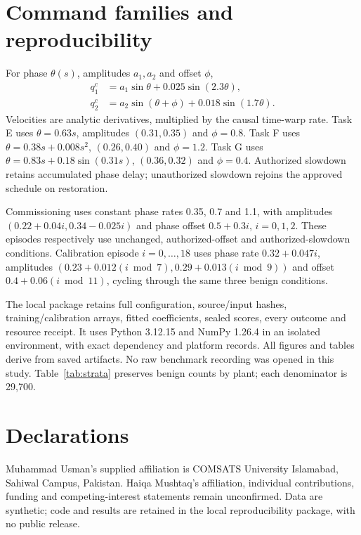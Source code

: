 \documentclass[11pt]{article}
\begin{document}
\clearpage
\appendix
\section{Command families and reproducibility}\label{app:tasks}
For phase $\theta(s)$, amplitudes $a_1,a_2$ and offset $\phi$,
\begin{align}
q_1^c&=a_1\sin\theta+0.025\sin(2.3\theta),\\
q_2^c&=a_2\sin(\theta+\phi)+0.018\sin(1.7\theta).
\end{align}
Velocities are analytic derivatives, multiplied by the causal time-warp rate. Task E uses $\theta=0.63s$, amplitudes $(0.31,0.35)$ and $\phi=0.8$. Task F uses $\theta=0.38s+0.008s^2$, $(0.26,0.40)$ and $\phi=1.2$. Task G uses $\theta=0.83s+0.18\sin(0.31s)$, $(0.36,0.32)$ and $\phi=0.4$. Authorized slowdown retains accumulated phase delay; unauthorized slowdown rejoins the approved schedule on restoration.

Commissioning uses constant phase rates 0.35, 0.7 and 1.1, with amplitudes $(0.22+0.04i,0.34-0.025i)$ and phase offset $0.5+0.3i$, $i=0,1,2$. These episodes respectively use unchanged, authorized-offset and authorized-slowdown conditions. Calibration episode $i=0,\ldots,18$ uses phase rate $0.32+0.047i$, amplitudes $(0.23+0.012(i\bmod7),0.29+0.013(i\bmod9))$ and offset $0.4+0.06(i\bmod11)$, cycling through the same three benign conditions.

The local package retains full configuration, source/input hashes, training/calibration arrays, fitted coefficients, sealed scores, every outcome and resource receipt. It uses Python 3.12.15 and NumPy 1.26.4 in an isolated environment, with exact dependency and platform records. All figures and tables derive from saved artifacts. No raw benchmark recording was opened in this study. Table~\ref{tab:strata} preserves benign counts by plant; each denominator is 29,700.

\begin{table}[htbp]\centering\small
\caption{Benign alarm observations by plant.}\label{tab:strata}

\end{table}

\section*{Declarations}
Muhammad Usman's supplied affiliation is COMSATS University Islamabad, Sahiwal Campus, Pakistan. Haiqa Mushtaq's affiliation, individual contributions, funding and competing-interest statements remain unconfirmed. Data are synthetic; code and results are retained in the local reproducibility package, with no public release.
\end{document}
